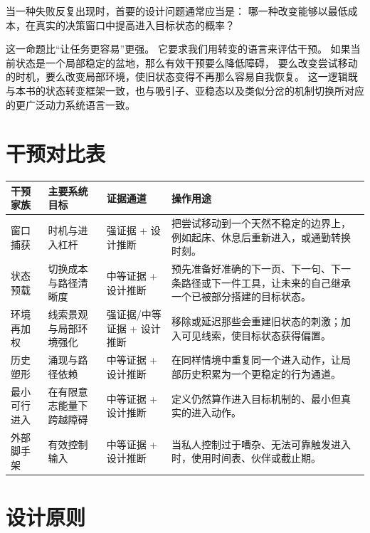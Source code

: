 \begin{proposition}[干预应瞄准转变几何结构]
当一种失败反复出现时，首要的设计问题通常应当是：
哪一种改变能够以最低成本，在真实的决策窗口中提高进入目标状态的概率？
\end{proposition}

\begin{discussion}
这一命题比“让任务更容易”更强。
它要求我们用转变的语言来评估干预。
如果当前状态是一个局部稳定的盆地，那么有效干预要么降低障碍，
要么改变尝试移动的时机，要么改变局部环境，使旧状态变得不再那么容易自我恢复。
这一逻辑既与本书的状态转变框架一致，也与吸引子、亚稳态以及类似分岔的机制切换所对应的更广泛动力系统语言一致。
\end{discussion}

\section{干预对比表}

\begin{center}
\begin{tabularx}{\textwidth}{@{}l l l X@{}}
\toprule
\textbf{干预家族} & \textbf{主要系统目标} & \textbf{证据通道} & \textbf{操作用途} \\
\midrule
窗口捕获 & 时机与进入杠杆 & 强证据 + 设计推断 & 把尝试移动到一个天然不稳定的边界上，例如起床、休息后重新进入，或通勤转换时刻。 \\
状态预载 & 切换成本与路径清晰度 & 中等证据 + 设计推断 & 预先准备好准确的下一页、下一句、下一条路径或下一件工具，让未来的自己继承一个已被部分搭建的目标状态。 \\
环境再加权 & 线索景观与局部环境强化 & 强证据/中等证据 + 设计推断 & 移除或延迟那些会重建旧状态的刺激；加入可见线索，使目标状态获得偏置。 \\
历史塑形 & 涌现与路径依赖 & 中等证据 + 设计推断 & 在同样情境中重复同一个进入动作，让局部历史积累为一个更稳定的行为通道。 \\
最小可行进入 & 在有限意志能量下跨越障碍 & 中等证据 + 设计推断 & 定义仍然算作进入目标机制的、最小但真实的进入动作。 \\
外部脚手架 & 有效控制输入 & 中等证据 + 设计推断 & 当私人控制过于嘈杂、无法可靠触发进入时，使用时间表、伙伴或截止期。 \\
\bottomrule
\end{tabularx}
\end{center}

\section{设计原则}

